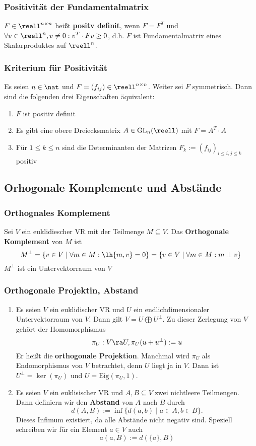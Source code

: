 \documentclass{kit}
\begin{document}
    \subsubsection{Positivität der Fundamentalmatrix}
      $F\in\reell^{n\times n}$ heißt \textbf{positv definit}, wenn $F=F^T$ und 
      $\forall v\in\reell^n,v\neq0:v^T\cdot Fv\ge0$, d.h. $F$ ist Fundamentalmatrix eines Skalarproduktes auf $\reell^n$.
    \subsubsection{Kriterium für Positivität}
      Es seien $n\in\nat$ und $F=(f_{ij})\in\reell^{n\times n}$. Weiter sei $F$ symmetrisch. Dann sind die folgenden
      drei Eigenschaften äquivalent:
      \begin{enumerate}[label=\roman*)]
        \item $F$ ist positiv definit
        \item Es gibt eine obere Dreiecksmatrix $A\in\text{GL}_n(\reell)$ mit $F=A^T\cdot A$
        \item Für $1\le k\le n$ sind die Determinanten der Matrizen $F_k:=(f_{ij})_{i\le i,j\le k}$ positiv
      \end{enumerate}
  \subsection{Orhogonale Komplemente und Abstände}
    \subsubsection{Orthognales Komplement}
      Sei $V$ ein euklidiescher VR mit der Teilmenge $M\subseteq V$. Das \textbf{Orthogonale Komplement} von $M$ ist
      $$M^\perp=\{v\in V\mid\forall m\in M:\lh{m,v}=0\}=\{v\in V\mid\forall m\in M:m\perp v\}$$
      $M^\perp$ ist ein Untervektorraum von $V$
    \subsubsection{Orthogonale Projektin, Abstand}
      \begin{enumerate}
        \item Es seien $V$ ein euklidischer VR und $U$ ein endlichdimensionaler Untervektorraum von $V$. Dann gilt
          $V=U\bigoplus U^\perp$. Zu dieser Zerlegung von $V$ gehört der Homomorphismus
          $$\pi_U:V\ra U,\pi_U(u+u^\perp):=u$$
          Er heißt die \textbf{orthogonale Projektion}. Manchmal wird $\pi_U$ als Endomorphismus von $V$ betrachtet, denn
        $U$ liegt ja in $V$. Dann ist $U^\perp=\ker(\pi_U)$ und $U=\text{Eig}(\pi_U,1)$.
      \item Es seien $V$ ein euklisischer VR und $A,B\subseteq V$ zwei nichtleere Teilmengen. Dann definiern wir den
        \textbf{Abstand} von $A$ nach $B$ durch
        $$d(A,B):=\inf\{d(a,b)\mid a\in A,b\in B\}.$$
        Dieses Infimum existiert, da alle Abstände nicht negativ sind. Speziell schreiben wir für ein Element $a\in V$ auch
        $$a(a,B):=d(\{a\},B)$$
      \end{enumerate}
\end{document}
